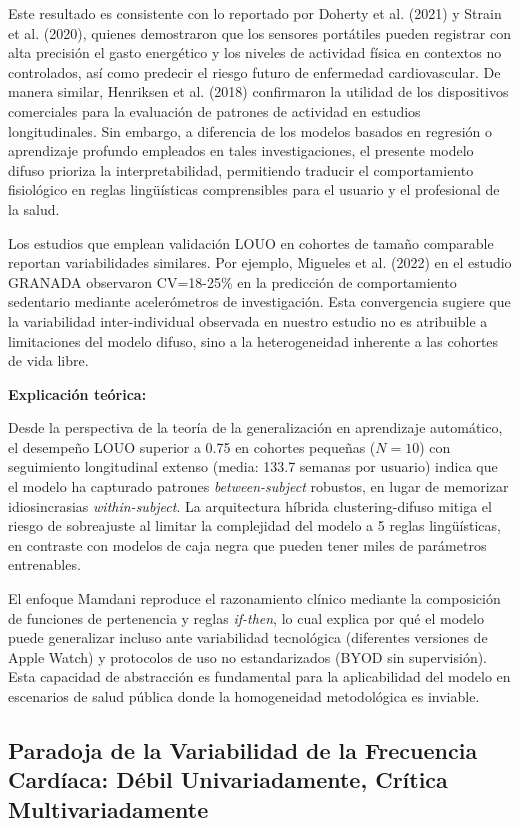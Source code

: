 Este resultado es consistente con lo reportado por Doherty et al. (2021) y Strain et al. (2020), quienes demostraron que los sensores portátiles pueden registrar con alta precisión el gasto energético y los niveles de actividad física en contextos no controlados, así como predecir el riesgo futuro de enfermedad cardiovascular. De manera similar, Henriksen et al. (2018) confirmaron la utilidad de los dispositivos comerciales para la evaluación de patrones de actividad en estudios longitudinales. Sin embargo, a diferencia de los modelos basados en regresión o aprendizaje profundo empleados en tales investigaciones, el presente modelo difuso prioriza la interpretabilidad, permitiendo traducir el comportamiento fisiológico en reglas lingüísticas comprensibles para el usuario y el profesional de la salud.

Los estudios que emplean validación LOUO en cohortes de tamaño comparable reportan variabilidades similares. Por ejemplo, Migueles et al. (2022) en el estudio GRANADA observaron CV=18-25\% en la predicción de comportamiento sedentario mediante acelerómetros de investigación. Esta convergencia sugiere que la variabilidad inter-individual observada en nuestro estudio no es atribuible a limitaciones del modelo difuso, sino a la heterogeneidad inherente a las cohortes de vida libre.

\textbf{Explicación teórica:}

Desde la perspectiva de la teoría de la generalización en aprendizaje automático, el desempeño LOUO superior a 0.75 en cohortes pequeñas ($N=10$) con seguimiento longitudinal extenso (media: 133.7 semanas por usuario) indica que el modelo ha capturado patrones \textit{between-subject} robustos, en lugar de memorizar idiosincrasias \textit{within-subject}. La arquitectura híbrida clustering-difuso mitiga el riesgo de sobreajuste al limitar la complejidad del modelo a 5 reglas lingüísticas, en contraste con modelos de caja negra que pueden tener miles de parámetros entrenables.

El enfoque Mamdani reproduce el razonamiento clínico mediante la composición de funciones de pertenencia y reglas \textit{if-then}, lo cual explica por qué el modelo puede generalizar incluso ante variabilidad tecnológica (diferentes versiones de Apple Watch) y protocolos de uso no estandarizados (BYOD sin supervisión). Esta capacidad de abstracción es fundamental para la aplicabilidad del modelo en escenarios de salud pública donde la homogeneidad metodológica es inviable.


\subsection{Paradoja de la Variabilidad de la Frecuencia Cardíaca: Débil Univariadamente, Crítica Multivariadamente}
\label{subsec:discusion_paradoja_hrv}

